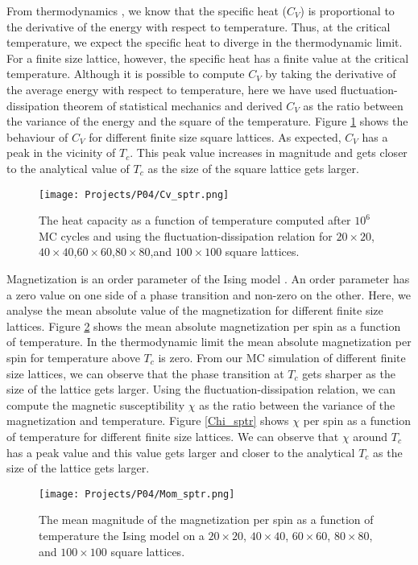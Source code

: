 \documentclass[a4paper]{article}
\begin{document}
From thermodynamics \cite{giordano}, we know that the specific heat ($C_V$) is proportional to the derivative of the energy with respect to temperature. Thus, at the critical temperature, we expect the specific heat to diverge in the thermodynamic limit. For a finite size lattice, however, the specific heat has a finite value at the critical temperature. Although it is possible to compute $C_V$ by taking the derivative of the average energy with respect to temperature, here we have used fluctuation-dissipation theorem of statistical mechanics \cite{giordano} and derived $C_V$ as the ratio between the variance of the energy and the square of the temperature. Figure \ref{Cv_sptr} shows the behaviour of $C_V$ for different finite size square lattices. As expected, $C_V$ has a peak in the vicinity of $T_c$. This peak value increases in magnitude and gets closer to the analytical value of $T_c$ as the size of the square lattice gets larger.

\begin{figure}[H]
  \centering
  \texttt{[image: Projects/P04/Cv\_sptr.png]}
  \caption{The heat capacity as a function of temperature computed after $10^6$ MC cycles and using the fluctuation-dissipation relation for $20\times20$,$40\times40$,$60\times60$,$80\times80$,and $100\times100$ square lattices.}
   \label{Cv_sptr}
\end{figure}

Magnetization is an order parameter of the Ising model \cite{newmanb99}. An order parameter has a zero value on one side of a phase transition and non-zero on the other. Here, we analyse the mean absolute value of the magnetization for different finite size lattices. Figure \ref{Mom_sptr} shows the mean absolute magnetization per spin as a function of temperature. In the thermodynamic limit the mean absolute magnetization per spin for temperature above $T_c$ is zero. From our MC simulation of different finite size lattices, we can observe that the phase transition at $T_c$ gets sharper as the size of the lattice gets larger. Using the fluctuation-dissipation relation, we can compute the magnetic susceptibility $\chi$ as the ratio between the variance of the magnetization and temperature. Figure \ref{Chi_sptr} shows $\chi$ per spin as a function of temperature for different finite size lattices. We can observe that $\chi$ around $T_c$ has a peak value and this value gets larger and closer to the analytical $T_c$ as the size of the lattice gets larger.

\begin{figure}[H]
  \centering
  \texttt{[image: Projects/P04/Mom\_sptr.png]}
  \caption{The mean magnitude of the magnetization per spin as a function of temperature the Ising model on a $20\times20$, $40\times40$, $60\times60$, $80\times80$, and $100\times100$ square lattices.}
   \label{Mom_sptr}
\end{figure}
\end{document}
